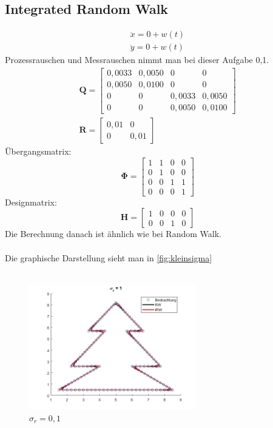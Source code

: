 \subsection{Integrated Random Walk}
\begin{gather*}
\ddot{x} = 0 + w(t) \\
\ddot{y} = 0 + w(t)
\end{gather*}
Prozessrauschen und Messrauschen nimmt man bei dieser Aufgabe 0,1.
\begin{gather*}
\bm{Q} = \begin{bmatrix}
0,0033 & 0,0050 & 0 & 0 \\
0,0050 & 0,0100 & 0 & 0 \\
0 & 0 & 0,0033 & 0,0050 \\
0 & 0 & 0,0050 & 0,0100 
\end{bmatrix} \\
\bm{R} = \begin{bmatrix}
0,01 & 0 \\
0 & 0,01
\end{bmatrix}
\end{gather*}
Übergangsmatrix:
\begin{equation*}
\bm{\Phi} = \begin{bmatrix}
1 & 1 & 0 & 0 \\
0 & 1 & 0 & 0 \\
0 & 0 & 1 & 1 \\
0 & 0 & 0 & 1
\end{bmatrix}
\end{equation*}
Designmatrix:
\begin{equation*}
\bm{H} = \begin{bmatrix}
1 & 0 & 0 & 0 \\
0 & 0 & 1 & 0 
\end{bmatrix}
\end{equation*}
Die Berechnung danach ist ähnlich wie bei Random Walk.\\\\
Die graphische Darstellung sieht man in \autoref{fig:kleinsigma} \\\\
\begin{figure}[htbp]
	\centering
	\includegraphics[width=0.65\textwidth]{images/kleinsigma} 
	\caption{$\sigma_r = 0,1$} 
	\label{fig:kleinsigma}
\end{figure}
